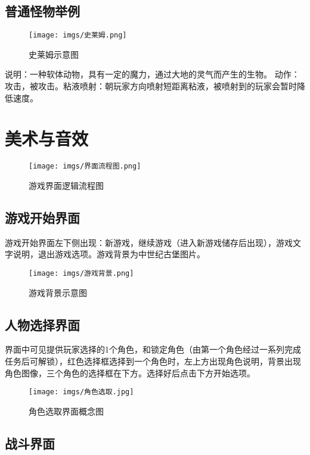 \documentclass[UTF8,AutoFakeBold=1,AutoFakeSlant,zihao=-4]{cucthesis}
\begin{document}
\subsection{普通怪物举例}

\begin{figure}[ht]
    \centering
    \texttt{[image: imgs/史莱姆.png]}    
    \caption{史莱姆示意图}
\end{figure}

说明：一种软体动物，具有一定的魔力，通过大地的灵气而产生的生物。
动作：攻击，被攻击。粘液喷射：朝玩家方向喷射短距离粘液，被喷射到的玩家会暂时降低速度。


\section{美术与音效}

\begin{figure}[ht]
    \centering
    \texttt{[image: imgs/界面流程图.png]}    
    \caption{游戏界面逻辑流程图}
\end{figure}

\subsection{游戏开始界面}

游戏开始界面左下侧出现：新游戏，继续游戏（进入新游戏储存后出现），游戏文字说明，退出游戏选项。游戏背景为中世纪古堡图片。

\begin{figure}[ht]
    \centering
    \texttt{[image: imgs/游戏背景.png]}    
    \caption{游戏背景示意图}
\end{figure}

\subsection{人物选择界面}

界面中可见提供玩家选择的1个角色，和锁定角色（由第一个角色经过一系列完成任务后可解锁），红色选择框选择到一个角色时，左上方出现角色说明，背景出现角色图像，三个角色的选择框在下方。选择好后点击下方开始选项。

\begin{figure}[ht]
    \centering
    \texttt{[image: imgs/角色选取.jpg]}    
    \caption{角色选取界面概念图}
\end{figure}

\subsection{战斗界面}
\end{document}
